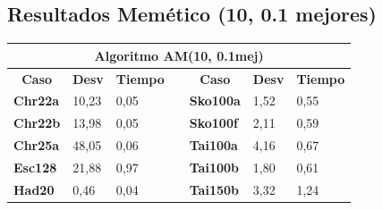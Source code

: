 \documentclass[a4paper, 12pt]{article}
\begin{document}
      \newpage
      \subsection{Resultados Memético (10, 0.1 mejores)}
      \begin{table}[H]
\centering
\label{my-label}
\begin{tabular}{|l|l|l|l|l|l|l|}
\hline
\multicolumn{7}{|c|}{\textbf{Algoritmo AM(10, 0.1mej)}}                                                                                                                                                                                                           \\ \hline
\multicolumn{1}{|c|}{\textbf{Caso}} & \multicolumn{1}{c|}{\textbf{Desv}} & \multicolumn{1}{c|}{\textbf{Tiempo}} & \multicolumn{1}{c|}{\textbf{}} & \multicolumn{1}{c|}{\textbf{Caso}} & \multicolumn{1}{c|}{\textbf{Desv}} & \multicolumn{1}{c|}{\textbf{Tiempo}} \\ \cline{1-3} \cline{5-7} 
\textbf{Chr22a}                     & 10,23                              & 0,05                                 &                                & \textbf{Sko100a}                   & 1,52                               & 0,55                                 \\ \cline{1-3} \cline{5-7} 
\textbf{Chr22b}                     & 13,98                              & 0,05                                 &                                & \textbf{Sko100f}                   & 2,11                               & 0,59                                 \\ \cline{1-3} \cline{5-7} 
\textbf{Chr25a}                     & 48,05                              & 0,06                                 &                                & \textbf{Tai100a}                   & 4,16                               & 0,67                                 \\ \cline{1-3} \cline{5-7} 
\textbf{Esc128}                     & 21,88                              & 0,97                                 &                                & \textbf{Tai100b}                   & 1,80                               & 0,61                                 \\ \cline{1-3} \cline{5-7} 
\textbf{Had20}                      & 0,46                               & 0,04                                 &                                & \textbf{Tai150b}                   & 3,32                               & 1,24                                 \\ \cline{1-3} \cline{5-7} 

\end{tabular}
\end{table}
\end{document}
